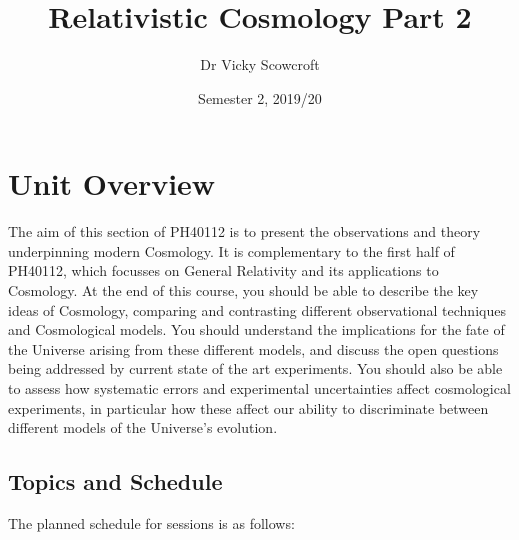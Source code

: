 \documentclass[11pt,a4paper]{book}
\title{Relativistic Cosmology Part 2}
\author{Dr Vicky Scowcroft}
\date{Semester 2, 2019/20}
\begin{document}
\maketitle

{
\hypersetup{linkcolor=black}
\setcounter{tocdepth}{1}
\tableofcontents
}
\hypertarget{unit-overview}{%
\chapter*{Unit Overview}\label{unit-overview}}

The aim of this section of PH40112 is to present the observations and
theory underpinning modern Cosmology. It is complementary to the first
half of PH40112, which focusses on General Relativity and its
applications to Cosmology. At the end of this course, you should be
able to describe the key ideas of Cosmology, comparing and contrasting
different observational techniques and Cosmological models. You should
understand the implications for the fate of the Universe arising from
these different models, and discuss the open questions being addressed
by current state of the art experiments. You should also be able to
assess how systematic errors and experimental uncertainties affect
cosmological experiments, in particular how these affect our ability
to discriminate between different models of the Universe's evolution.

\hypertarget{topics-and-schedule}{%
\section*{Topics and Schedule}\label{topics-and-schedule}}

The planned schedule for sessions is as follows:
\end{document}
